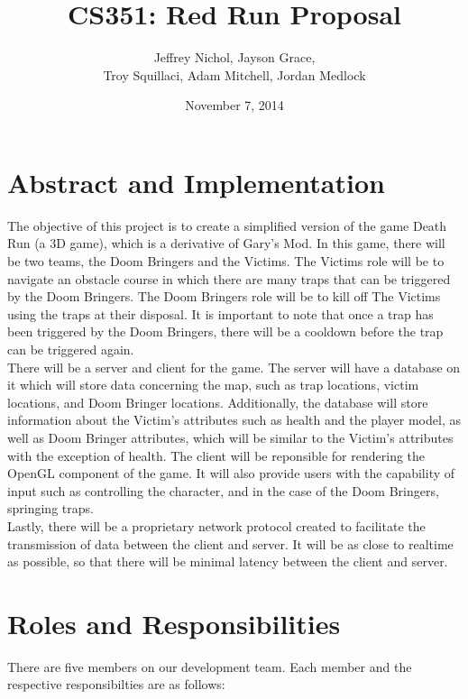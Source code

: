 \documentclass[12pt, a4paper, oneside]{article}
\begin{document}
\title{CS351: Red Run Proposal}
\author{Jeffrey Nichol, Jayson Grace, \\
Troy Squillaci, Adam Mitchell, Jordan Medlock}
\date{November 7, 2014}
\maketitle

\section*{Abstract and Implementation}

The objective of this project is to create a simplified version of the game Death Run (a 3D game), which is a derivative of Gary's Mod. In this game, there will be two teams, the Doom Bringers and the Victims. The Victims role will be to navigate an obstacle course in which there are many traps that can be triggered by the Doom Bringers. The Doom Bringers role will be to kill off The Victims using the traps at their disposal. It is important to note that once a trap has been triggered by the Doom Bringers, there will be a cooldown before the trap can be triggered again. \\

There will be a server and client for the game. The server will have a database on it which will store data concerning the map, such as trap locations, victim locations, and Doom Bringer locations. Additionally, the database will store information about the Victim's attributes such as health and the player model, as well as Doom Bringer attributes, which will be similar to the Victim's attributes with the exception of health. The client will be reponsible for rendering the OpenGL component of the game. It will also provide users with the capability of input such as controlling the character, and in the case of the Doom Bringers, springing traps. \\

Lastly, there will be a proprietary network protocol created to facilitate the transmission of data between the client and server. It will be as close to realtime as possible, so that there will be minimal latency between the client and server.

\section*{Roles and Responsibilities}
There are five members on our development team. Each member and the respective responsibilties are as follows:
\end{document}
